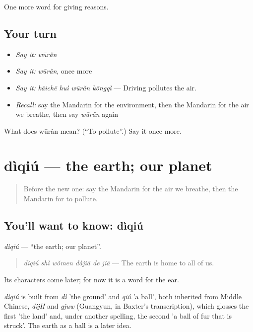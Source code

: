 \begin{grammarlens}[title={What you've built}]
One more word for giving reasons.
\end{grammarlens}

\subsection*{Your turn}
\begin{itemize}
\raggedright
  \item \emph{Say it:} \emph{wūrǎn}
  \item \emph{Say it:} \emph{wūrǎn}, once more
  \item \emph{Say it:} \emph{kāichē huì wūrǎn kōngqì} — Driving pollutes the air.
  \item \emph{Recall:} say the Mandarin for the environment, then the Mandarin for the air we breathe, then say \emph{wūrǎn} again
\end{itemize}

\begin{tcolorbox}[breakable,colback=teal!4,colframe=teal!35!black,title={Before you move on}]
What does wūrǎn mean? (\textquotedblleft{}To pollute\textquotedblright{}.) Say it once more.
\end{tcolorbox}
\section[dìqiú]{dìqiú — the earth; our planet}

\label{lesson:ZH-C380-diqiu}



\begin{quote}
Before the new one: say the Mandarin for the air we breathe, then the Mandarin for to pollute.
\end{quote}

\subsection*{You'll want to know: dìqiú}
\emph{dìqiú} — \textquotedblleft{}the earth; our planet\textquotedblright{}.

\begin{quote}
\emph{dìqiú shì wǒmen dàjiā de jiā} — The earth is home to all of us.
\end{quote}

Its characters come later; for now it is a word for the ear.

\begin{cousinweb}
\emph{dìqiú} is built from \emph{dì} 'the ground' and \emph{qiú} 'a ball', both inherited from Middle Chinese, \emph{dijH} and \emph{gjuw} (Guangyun, in Baxter's transcription), which glosses the first 'the land' and, under another spelling, the second 'a ball of fur that is struck'. The earth as a ball is a later idea.
\end{cousinweb}

